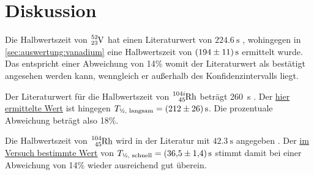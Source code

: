 \section{Diskussion} \label{sec:diskussion}

Die Halbwertszeit von
$\ce{^{52}_{23}V}$
hat einen Literaturwert von
$\SI{224.6}{\second}$ \cite{hwz_vanadium},
wohingegen in \autoref{sec:auswertung:vanadium}
eine Halbwertszeit von $\SI{194 \pm 11}{\second}$ ermittelt wurde.
Das entspricht einer Abweichung von 14\%
womit der Literaturwert als bestätigt angesehen werden kann,
wenngleich er außerhalb des Konfidenzintervalls liegt.

Der Literaturwert für die Halbwertszeit von $\ce{^{104i}_{45}Rh}$
beträgt \SI{260}{\second} \cite{hwz_rhodium_langsam}.
Der \hyperref[sec:auswertung:rhodium:langsam]{hier ermittelte Wert}
ist hingegen $T_\text{½, langsam} = \SI{212 \pm 26}{\second}$.
Die prozentuale Abweichung beträgt also 18\%.

Die Halbwertszeit von $\ce{^{104}_{45}Rh}$
wird in der Literatur mit
$\SI{42.3}{\second}$ angegeben \cite{hwz_rhodium_schnell}.
Der \hyperref[sec:auswertung:rhodium:schnell]{im Versuch bestimmte Wert} von
$T_\text{½, schnell} = \SI{36.5 \pm 1.4}{\second}$
stimmt damit bei einer Abweichung von 14\% wieder ausreichend gut überein.

%
%
%
